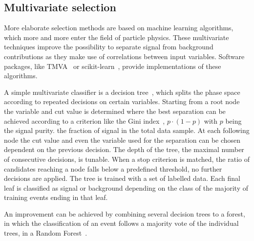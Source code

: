 
\subsection{Multivariate selection}
\label{sec:dataanalysis:selection:bdt}

More elaborate selection methods are based on machine learning algorithms,
which more and more enter the field of particle physics. These multivariate
techniques improve the possibility to separate signal from background
contributions as they make use of correlations between input variables.
Software packages, like TMVA~\cite{Hocker:2007ht} or
scikit-learn~\cite{scikit-learn}, provide implementations of these algorithms.

A simple multivariate classifier is a decision tree~\cite{Breiman}, which
splits the phase space according to repeated decisions on certain variables.
Starting from a root node the variable and cut value is determined where the
best separation can be achieved according to a criterion like the Gini
index~\cite{giniindex}, $p \cdot (1-p)$ with $p$ being the signal purity. \ie
the fraction of signal in the total data sample. At each following node the
cut value and even the variable used for the separation can be chosen
dependent on the previous decision. The depth of the tree, \ie the maximal
number of consecutive decisions, is tunable. When a stop criterion is matched,
\eg the ratio of candidates reaching a node falls below a predefined
threshold, no further decisions are applied. The tree is trained with a set of
labelled data. Each final leaf is classified as signal or background depending
on the class of the majority of training events ending in that leaf.

An improvement can be achieved by combining several decision trees to a
forest, in which the classification of an event follows a majority vote
of the individual trees, \eg in a Random Forest~\cite{RandomForest}.

